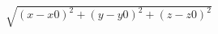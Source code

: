 \documentclass{article}
\begin{document}
$\sqrt{(x-x0)^2+(y-y0)^2+(z-z0)^2}$
\pagebreak
\end{document}
